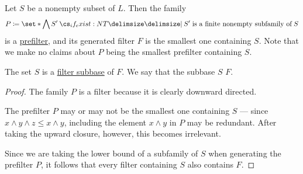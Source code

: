 \begin{proposition}\label{thm:filter_from_subbase}
  Let \( S \) be a nonempty subset of \( L \). Then the family
  \begin{equation*}
    P \coloneqq \set*{ \bigwedge S' \given* S' \T{is a finite nonempty subfamily of} S }
  \end{equation*}
  is a \hyperref[def:prefilter]{prefilter}, and its generated filter \( F \) is the smallest one containing \( S \). Note that we make no claims about \( P \) being the smallest prefilter containing \( S \).

  The set \( S \) is a \hyperref[def:filter_subbase]{filter subbase} of \( F \). We say that the subbase \( S \)  \( F \).
\end{proposition}
\begin{proof}
  The family \( P \) is a filter because it is clearly downward directed.

  The prefilter \( P \) may or may not be the smallest one containing \( S \) --- since \( x \wedge y \wedge z \leq x \wedge y \), including the element \( x \wedge y \) in \( P \) may be redundant. After taking the upward closure, however, this becomes irrelevant.

  Since we are taking the  lower bound of a subfamily of \( S \) when generating the prefilter \( P \), it follows that every filter containing \( S \) also contains \( F \).
\end{proof}

